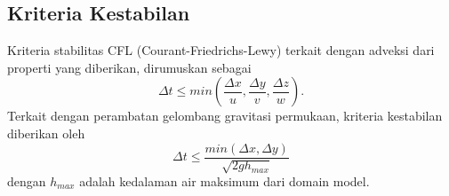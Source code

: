 \begin{spacing}{1.5}
\subsection[Kriteria Kestabilan]{Kriteria Kestabilan}
	Kriteria stabilitas CFL (Courant-Friedrichs-Lewy) terkait dengan adveksi dari properti yang diberikan, dirumuskan sebagai
	\begin{equation}
		\Delta t \leq min\left(\frac{\Delta x}{u},\frac{\Delta y}{v},\frac{\Delta z}{w}\right).
	\end{equation}
	Terkait dengan perambatan gelombang gravitasi permukaan, kriteria kestabilan diberikan oleh
	\begin{equation}
		\Delta t \leq \frac{min(\Delta x,\Delta y)}{\sqrt{2gh_{max}}}
	\end{equation} 
	dengan $h_{max}$ adalah kedalaman air maksimum dari domain model.
\end{spacing}
\vspace{-0.1pc}
